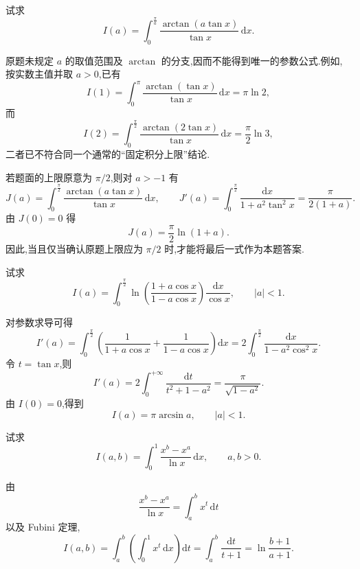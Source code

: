 \begin{example}
    试求
    \[
        I(a)=\int_0^{\frac{\pi}{a}}\dfrac{\arctan(a\tan x)}{\tan x}\,\mathrm{d}x.
    \]
\end{example}
\exampleblank

\begin{solution}
    原题未规定 $a$ 的取值范围及 $\arctan$ 的分支,因而不能得到唯一的参数公式.例如,按实数主值并取 $a>0$,已有
    \[
        I(1)=\int_0^\pi\dfrac{\arctan(\tan x)}{\tan x}\,\mathrm{d}x
        =\pi\ln2,
    \]
    而
    \[
        I(2)=\int_0^{\frac{\pi}{2}}\dfrac{\arctan(2\tan x)}{\tan x}\,\mathrm{d}x
        =\dfrac{\pi}{2}\ln3,
    \]
    二者已不符合同一个通常的“固定积分上限”结论.

    若题面的上限原意为 $\pi/2$,则对 $a>-1$ 有
    \[
        J(a)=\int_0^{\frac{\pi}{2}}\dfrac{\arctan(a\tan x)}{\tan x}\,\mathrm{d}x,
        \qquad
        J'(a)=\int_0^{\frac{\pi}{2}}\dfrac{\mathrm{d}x}{1+a^2\tan^2x}
        =\dfrac{\pi}{2(1+a)}.
    \]
    由 $J(0)=0$ 得
    \[
        J(a)=\dfrac{\pi}{2}\ln(1+a).
    \]
    因此,当且仅当确认原题上限应为 $\pi/2$ 时,才能将最后一式作为本题答案.
\end{solution}

\begin{example}
    试求
    \[
        I(a)=\int_0^{\frac{\pi}{2}}\ln\left(\dfrac{1+a\cos x}{1-a\cos x}\right)\dfrac{\mathrm{d}x}{\cos x},
        \qquad |a|<1.
    \]
\end{example}
\exampleblank

\begin{solution}
    对参数求导可得
    \[
        I'(a)=\int_0^{\frac{\pi}{2}}
        \left(\dfrac{1}{1+a\cos x}+\dfrac{1}{1-a\cos x}\right)\mathrm{d}x
        =2\int_0^{\frac{\pi}{2}}\dfrac{\mathrm{d}x}{1-a^2\cos^2x}.
    \]
    令 $t=\tan x$,则
    \[
        I'(a)=2\int_0^{+\infty}\dfrac{\mathrm{d}t}{t^2+1-a^2}
        =\dfrac{\pi}{\sqrt{1-a^2}}.
    \]
    由 $I(0)=0$,得到
    \[
        I(a)=\pi\arcsin a,
        \qquad |a|<1.
    \]
\end{solution}

\begin{example}
    试求
    \[
        I(a,b)=\int_0^1\dfrac{x^b-x^a}{\ln x}\,\mathrm{d}x,
        \qquad a,b>0.
    \]
\end{example}
\exampleblank

\begin{solution}
    由
    \[
        \dfrac{x^b-x^a}{\ln x}=\int_a^b x^t\,\mathrm{d}t
    \]
    以及 Fubini 定理,
    \[
        I(a,b)=\int_a^b\left(\int_0^1x^t\,\mathrm{d}x\right)\mathrm{d}t
        =\int_a^b\dfrac{\mathrm{d}t}{t+1}
        =\ln\dfrac{b+1}{a+1}.
    \]
\end{solution}

